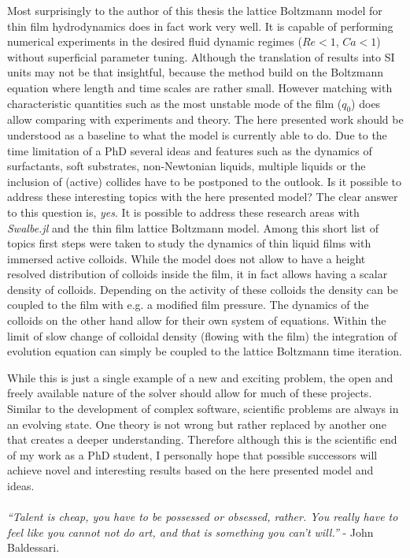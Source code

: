 Most surprisingly to the author of this thesis the lattice Boltzmann model for thin film hydrodynamics does in fact work very well. 
It is capable of performing numerical experiments in the desired fluid dynamic regimes ($Re < 1$, $Ca < 1$) without superficial parameter tuning. 
Although the translation of results into SI units may not be that insightful, because the method build on the Boltzmann equation where length and time scales are rather small.  
However matching with characteristic quantities such as the most unstable mode of the film ($q_0$) does allow comparing with experiments and theory.
The here presented work should be understood as a baseline to what the model is currently able to do.
Due to the time limitation of a PhD several ideas and features such as the dynamics of surfactants, soft substrates, non-Newtonian liquids, multiple liquids or the inclusion of (active) collides have to be postponed to the outlook.  
Is it possible to address these interesting topics with the here presented model?
The clear answer to this question is, \textit{yes}. 
It is possible to address these research areas with \textit{Swalbe.jl} and the thin film lattice Boltzmann model.
Among this short list of topics first steps were taken to study the dynamics of thin liquid films with immersed active colloids.
While the model does not allow to have a height resolved distribution of colloids inside the film, it in fact allows having a scalar density of colloids.
Depending on the activity of these colloids the density can be coupled to the film with e.g. a modified film pressure.
The dynamics of the colloids on the other hand allow for their own system of equations.
Within the limit of slow change of colloidal density (flowing with the film) the integration of evolution equation can simply be coupled to the lattice Boltzmann time iteration. 

While this is just a single example of a new and exciting problem, the open and freely available nature of the solver should allow for much of these projects.
Similar to the development of complex software, scientific problems are always in an evolving state.
One theory is not wrong but rather replaced by another one that creates a deeper understanding.
Therefore although this is the scientific end of my work as a PhD student, I personally hope that possible successors will achieve novel and interesting results based on the here presented model and ideas.\\
\\

\textit{``Talent is cheap, you have to be possessed or obsessed, rather. You really have to feel like you cannot not do art, and that is something you can’t will.''} - John Baldessari.

